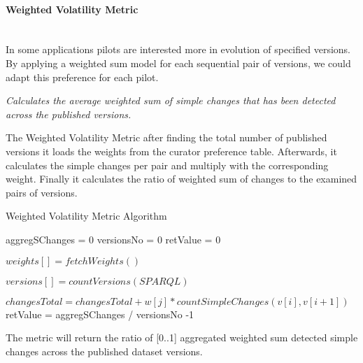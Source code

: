 
\paragraph{Weighted Volatility Metric} ~\\ %
In some applications pilots are interested more in evolution of specified versions. By applying a weighted sum model \cite{WSM} for each sequential pair of versions, we could adapt this preference for each pilot.

\begin{mdframed}[style=metricdefinition]
\emph{Calculates the average weighted sum of simple changes that has been detected across the published versions.}
\end{mdframed}

The Weighted Volatility Metric after finding the total number of published versions it loads the weights
from the curator preference table. Afterwards, it calculates the simple changes per pair and multiply with the corresponding weight. Finally it calculates the ratio of weighted sum of changes to the examined pairs of versions.


\begin{algorithm}
\caption{Weighted Volatility Metric Algorithm}
\begin{algorithmic}[1]

\State aggregSChanges = 0
\State versionsNo = 0
\State retValue = 0
\EndProcedure

\State $ weights [] = fetchWeights()$
\EndProcedure

\State $ versions [] = countVersions (SPARQL)$

\State $changesTotal = changesTotal + w[j]*countSimpleChanges(v[i],v[i+1])$
	\EndFor
\EndFor
\EndProcedure
\State retValue = aggregSChanges / versionsNo -1
\State {}
\end{algorithmic}
\end{algorithm}

The metric will return the ratio of [0..1] aggregated weighted sum detected simple changes across the published dataset versions.





